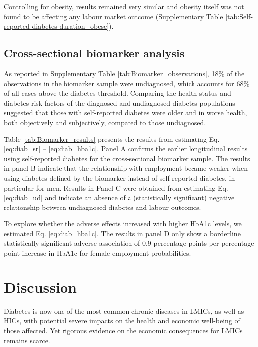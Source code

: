 \documentclass[12pt,english]{article}
\begin{document}
Controlling for obesity, results remained very similar and obesity itself was not found to be affecting any labour market outcome (Supplementary Table \ref{tab:Self-reported-diabetes-duration_obese}).



\FloatBarrier

\subsection{Cross-sectional biomarker analysis}


As reported in Supplementary Table \ref{tab:Biomarker_observations}, 18\% of the observations in the biomarker sample were undiagnosed, which accounts for 68\% of all cases above the diabetes threshold. Comparing the health status and diabetes risk factors of the diagnosed and undiagnosed diabetes populations suggested that those with self-reported diabetes were older and in worse health, both objectively and subjectively, compared to those undiagnosed.

Table \ref{tab:Biomarker_results} presents the results from estimating Eq. \ref{eq:diab_sr} -- \ref{eq:diab_hba1c}. Panel A confirms the earlier longitudinal results using self-reported diabetes for the cross-sectional biomarker sample. The results in panel B indicate that the relationship with employment became weaker when using diabetes defined by the biomarker instead of self-reported diabetes, in particular for men. Results in Panel C were obtained from estimating Eq. \ref{eq:diab_ud} and indicate an absence of a (statistically significant) negative relationship between undiagnosed diabetes and labour outcomes. 

To explore whether the adverse effects increased with higher \ac{HbA1c} levels, we estimated Eq. \ref{eq:diab_hba1c}. The results in panel D only show a borderline statistically significant adverse association of 0.9 percentage points per percentage point increase in \ac{HbA1c} for female employment probabilities.


\FloatBarrier

\section{\label{sec:cha_4_conclusion}Discussion}

Diabetes is now one of the most common chronic diseases in \acp{LMIC}, as well as \acp{HIC}, with potential severe impacts on the health and economic well-being of those affected.  Yet rigorous evidence on the economic consequences for \acp{LMIC} remains scarce.
\end{document}
